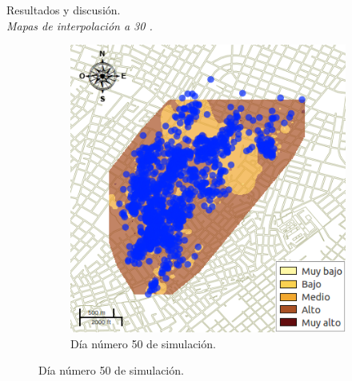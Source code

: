 \begin{frame}[t]{Resultados y discusión.\\\textit{Mapas de interpolación a 30 \textcelsius.}}
\begin{figure}
\begin{subfigure}[b]{0.45\textwidth}
        \includegraphics[width=\textwidth]{../book/capitulo-6/graphics/raster/temp-30-35.png}
        \caption{Día número 50 de simulación.}
    \end{subfigure}
    \end{figure}
\end{frame}


